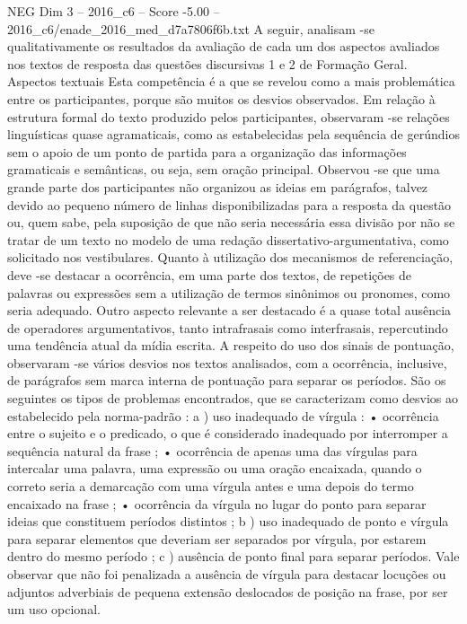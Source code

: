 \begin{textsample}{NEG Dim 3 – 2016\_c6 – Score -5.00 – 2016\_c6/enade\_2016\_med\_d7a7806f6b.txt}
A seguir, analisam -se qualitativamente os resultados da avaliação de cada um dos aspectos avaliados nos textos de resposta das questões discursivas 1 e 2 de Formação Geral.
Aspectos textuais Esta competência é a que se revelou como a mais problemática entre os participantes, porque são muitos os desvios observados.
Em relação à estrutura formal do texto produzido pelos participantes, observaram -se relações linguísticas quase agramaticais, como as estabelecidas pela sequência de gerúndios sem o apoio de um ponto de partida para a organização das informações gramaticais e semânticas, ou seja, sem oração principal.
Observou -se que uma grande parte dos participantes não organizou as ideias em parágrafos, talvez devido ao pequeno número de linhas disponibilizadas para a resposta da questão ou, quem sabe, pela suposição de que não seria necessária essa divisão por não se tratar de um texto no modelo de uma redação dissertativo-argumentativa, como solicitado nos vestibulares.
Quanto à utilização dos mecanismos de referenciação, deve -se destacar a ocorrência, em uma parte dos textos, de repetições de palavras ou expressões sem a utilização de termos sinônimos ou pronomes, como seria adequado.
Outro aspecto relevante a ser destacado é a quase total ausência de operadores argumentativos, tanto intrafrasais como interfrasais, repercutindo uma tendência atual da mídia escrita.
A respeito do uso dos sinais de pontuação, observaram -se vários desvios nos textos analisados, com a ocorrência, inclusive, de parágrafos sem marca interna de pontuação para separar os períodos.
São os seguintes os tipos de problemas encontrados, que se caracterizam como desvios ao estabelecido pela norma-padrão : a ) uso inadequado de vírgula : • ocorrência entre o sujeito e o predicado, o que é considerado inadequado por interromper a sequência natural da frase ; • ocorrência de apenas uma das vírgulas para intercalar uma palavra, uma expressão ou uma oração encaixada, quando o correto seria a demarcação com uma vírgula antes e uma depois do termo encaixado na frase ; • ocorrência da vírgula no lugar do ponto para separar ideias que constituem períodos distintos ; b ) uso inadequado de ponto e vírgula para separar elementos que deveriam ser separados por vírgula, por estarem dentro do mesmo período ; c ) ausência de ponto final para separar períodos.
Vale observar que não foi penalizada a ausência de vírgula para destacar locuções ou adjuntos adverbiais de pequena extensão deslocados de posição na frase, por ser um uso opcional.

\end{textsample}

